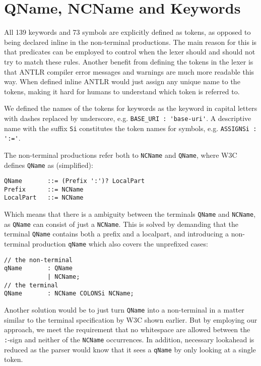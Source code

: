 \section{QName, NCName and Keywords}
\label{sect:rewritegrammar:keywordNCName}

All 139 keywords and 73 symbols are explicitly defined as tokens, as opposed to being declared inline in the non-terminal productions. The main reason for this is that predicates can be employed to control when the lexer should and should not try to match these rules. Another benefit from defining the tokens in the lexer is that ANTLR compiler error messages and warnings are much more readable this way. When defined inline ANTLR would just assign any unique name to the tokens, making it hard for humans to understand which token is referred to. 

We defined the names of the tokens for keywords as the keyword in capital letters with dashes replaced by underscore, e.g. \verb!BASE_URI : 'base-uri'!. A descriptive name with the suffix \verb!Si! constitutes the token names for symbols, e.g. \verb!ASSIGNSi : ':='!.

The non-terminal productions refer both to \verb!NCName! and \verb!QName!, where W3C defines \verb!QName! as (simplified):
\begin{Verbatim}
QName       ::= (Prefix ':')? LocalPart
Prefix      ::= NCName
LocalPart   ::= NCName
\end{Verbatim}

Which means that there is a ambiguity between the terminals \verb!QName! and \verb!NCName!, as \verb!QName! can consist of just a \verb!NCName!. This is solved by demanding that the terminal \verb!QName! contains both a prefix and a localpart, and introducing a non-terminal production \verb!qName! which also covers the unprefixed cases:
\begin{Verbatim}
// the non-terminal
qName       : QName
            | NCName;
// the terminal
QName       : NCName COLONSi NCName;
\end{Verbatim}

Another solution would be to just turn \verb!QName! into a non-terminal in a matter similar to the terminal specification by W3C shown earlier. But by employing our approach, we meet the requirement that no whitespace are allowed between the \verb!:!-sign and neither of the \verb!NCName! occurrences. In addition, necessary lookahead is reduced as the parser would know that it sees a \verb!qName! by only looking at a single token.

